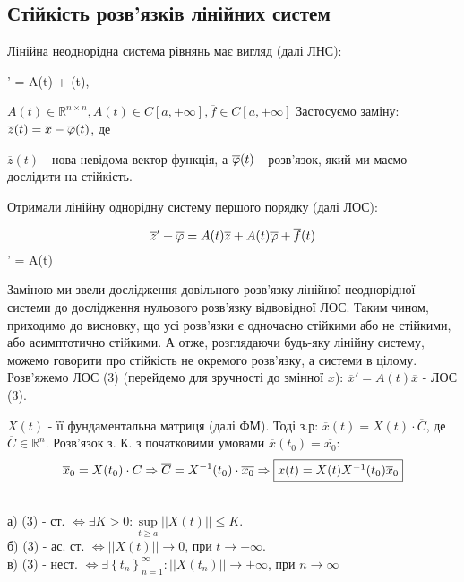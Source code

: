 \subsection{Стійкість розв'язків лінійних систем}

Лінійна неоднорідна система рівнянь має вигляд (далі ЛНС):

\be
{}' = A(t)  +  (t), 
\ee

$
A(t) \in \mathbb{R}^{n \times n}, A(t) \in C [ a, + \infty], \overline{f} \in C[a, + \infty]
$
Застосуємо заміну: $ \overline{z} (t) = \overline{x} - \overline{\varphi} (t)$, де

$ \overline{z}(t)$ - нова невідома вектор-функція, а $\overline{\varphi} (t)$ - розв'язок, який ми маємо дослідити на стійкість.

Отримали лінійну однорідну систему першого порядку (далі ЛОС):

$$ \overline{z} '   + \overline{\varphi} = A(t)\overline{z} + A(t )\overline{\varphi} + \overline{f}(t) $$
\be
{}' = A(t) 
\ee

Заміною ми звели дослідження довільного розв'язку лінійної неоднорідної системи до дослідження нульового розв'язку відвовідної ЛОС. Таким чином, приходимо до висновку, що усі розв'язки є одночасно стійкими або не стійкими, або асимптотично стійкими. А отже, розглядаючи будь-яку лінійну систему, можемо говорити про стійкість не окремого розв'язку, а системи в цілому.\\

Розв'яжемо ЛОС (3) (перейдемо для зручності до змінної $x$): $ \overline{x}'  =  A(t) \overline{x} $ - ЛОС (3).

$X(t) $ - її фундаментальна матриця (далі ФМ). Тоді з.р: $ \overline{x} (t) = X(t) \cdot \overline{C}$, де $\overline{ C} \in \mathbb{R}^n$.
Розв'язок з. К. з початковими умовами $ \overline{x} (t_0) = \overline{x_0}$:
$$
\overline{x}_0 = X(t_0) \cdot C \Rightarrow \overline{C} = X^{-1} (t_0) \cdot \overline{x_0} \Rightarrow \fbox{$x(t) = X(t) X^{-1}(t_0) \overline{x}_0$}
$$


\begin{boxteo}\quad \\
а) (3) - ст. $\Longleftrightarrow \exists K > 0: \sup\limits_{t\geq  a} ||X(t) || \leq K$.\\
б) (3) - ас. ст. $\Longleftrightarrow  ||X(t)|| \to 0 $, при $ t \to +\infty$.\\
в) (3) - нест. $ \Longleftrightarrow \exists \left\lbrace t_n \right\rbrace_{n=1}^{\infty} : ||X(t_n)|| \to +\infty $, при $n \to \infty$
\end{boxteo}



